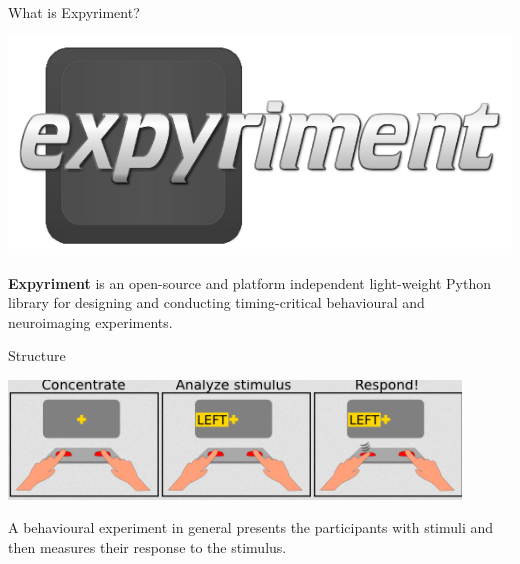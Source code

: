 \begin{frame}[fragile]{What is Expyriment?}

    \includegraphics[width=\textwidth]{13_Expyriment/expyriment.png}

    \textbf{Expyriment} is an open-source and platform independent light-weight Python library for designing and conducting timing-critical behavioural and neuroimaging experiments. 


\end{frame}


\begin{frame}[fragile]{Structure}

    \includegraphics[width=0.9\textwidth]{13_Expyriment/stimulus_response.png}

    \vspace{1em}

    A behavioural experiment in general presents the participants with stimuli and then measures their response to the stimulus.

\end{frame}

